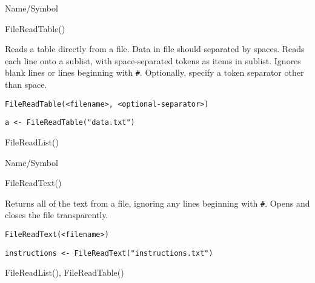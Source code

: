 \begin{desc}{Name/Symbol}
\item[Name/Symbol]	FileReadTable()

\item[Description]	Reads a table directly from a file. Data in file should
		separated by spaces.  Reads each line onto a sublist,
		with space-separated tokens as items in sublist.  Ignores
		blank lines or lines beginning with \verb+#+. Optionally,
		specify a token separator other than space.

\item[Usage]
\begin{verbatim}
FileReadTable(<filename>, <optional-separator>)
\end{verbatim}

\item[Example]
\begin{verbatim}
a <- FileReadTable("data.txt")
\end{verbatim}

\item[See Also]	FileReadList()
\end{desc}

\rl




\begin{desc}{Name/Symbol}
\item[Name/Symbol]	FileReadText()

\item[Description]	Returns all of the text from a file, ignoring any lines
		beginning with \verb+#+. Opens and closes the file transparently.

\item[Usage]
\begin{verbatim}
FileReadText(<filename>)
\end{verbatim}

\item[Example]
\begin{verbatim}
instructions <- FileReadText("instructions.txt")
\end{verbatim}

\item[See Also]	FileReadList(), FileReadTable()
\end{desc}

\rl



